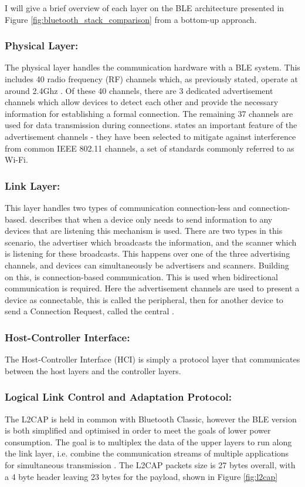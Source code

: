 \documentclass{l4proj}
\begin{document}
I will give a brief overview of each layer on the BLE architecture presented in Figure \ref{fig:bluetooth_stack_comparison} from a bottom-up approach.

\subsubsection{Physical Layer:} The physical layer handles the communication hardware with a BLE system. This includes 40 radio frequency (RF) channels which, as previously stated, operate at around 2.4Ghz \citep{yang_beyond_2020}. Of these 40 channels, there are 3 dedicated advertisement channels which allow devices to detect each other and provide the necessary information for establishing a formal connection. The remaining 37 channels are used for data transmission during connections. \citet{gomez_overview_2012} states an important feature of the advertisement channels - they have been selected to mitigate against interference from common IEEE 802.11 channels, a set of standards commonly referred to as Wi-Fi.

\subsubsection{Link Layer:} This layer handles two types of communication connection-less and connection-based. \citet{yang_beyond_2020} describes that when a device only needs to send information to any devices that are listening this mechanism is used. There are two types in this scenario, the advertiser which broadcasts the information, and the scanner which is listening for these broadcasts. This happens over one of the three advertising channels, and devices can simultaneously be advertisers and scanners. Building on this, is connection-based communication. This is used when bidirectional communication is required. Here the advertisement channels are used to present a device as connectable, this is called the peripheral, then for another device to send a Connection Request, called the central \citep{gomez_overview_2012}.

\subsubsection{Host-Controller Interface:} The Host-Controller Interface (HCI) is simply a protocol layer that communicates between the host layers and the controller layers.

\subsubsection{Logical Link Control and Adaptation Protocol:} The L2CAP is held in common with Bluetooth Classic, however the BLE version is both simplified and optimised in order to meet the goals of lower power consumption. The goal is to multiplex the data of the upper layers to run along the link layer, i.e. combine the communication streams of multiple applications for simultaneous transmission \citep{gomez_overview_2012}. The L2CAP packets size is 27 bytes overall, with a 4 byte header leaving 23 bytes for the payload, shown in Figure \ref{fig:l2cap}
\end{document}
